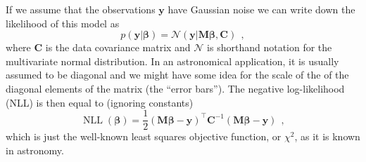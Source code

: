 \documentclass[12pt,dvipsnames]{report}
\renewcommand{\vec}[1]{\boldsymbol{\mathbf{#1}}}
\newcommand{\hquad}{~~}
\begin{document}
If we assume that the observations
$\vec{y}$ have Gaussian noise we can write down the likelihood of this model as
\begin{equation}
    p(\vec{y}\lvert \vec \beta)=\mathcal{N}(\vec{y}\lvert\vec{M}\vec \beta, \vec{C})
    \hquad,
\end{equation}
where $\vec{C}$ is the data covariance matrix and $\mathcal{N}$ is shorthand notation for
the multivariate normal distribution. In an astronomical application, it is usually
assumed to be diagonal and we might have some idea for the scale of the 
of the diagonal elements of the matrix (the ``error bars'').
The negative log-likelihood (NLL) is then equal to (ignoring constants)
\begin{equation}
    \operatorname{NLL}(\vec \beta)=\frac{1}{2}(\vec{M} \vec\beta -\vec{y})^{\intercal}\vec{C}^{-1}(\vec{M} \vec\beta-\vec{y})
    \hquad,
\end{equation}
which is just the well-known least squares objective function, or $\chi^2$, as it is known
in astronomy.
\end{document}
